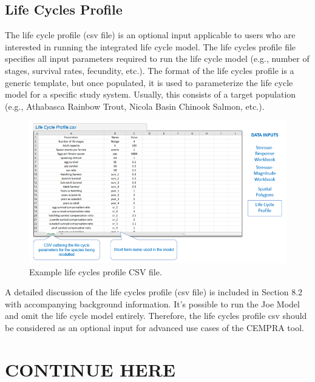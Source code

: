 \documentclass[
  letterpaper,
  DIV=11,
  numbers=noendperiod]{scrreprt}
\begin{document}
\hypertarget{life-cycles-profile}{%
\section{Life Cycles Profile}\label{life-cycles-profile}}

The life cycle profile (csv file) is an optional input applicable to
users who are interested in running the integrated life cycle model. The
life cycles profile file specifies all input parameters required to run
the life cycle model (e.g., number of stages, survival rates, fecundity,
etc.). The format of the life cycles profile is a generic template, but
once populated, it is used to parameterize the life cycle model for a
specific study system. Usually, this consists of a target population
(e.g., Athabasca Rainbow Trout, Nicola Basin Chinook Salmon, etc.).

\begin{figure}

{\centering \includegraphics{images/image024.png}

}

\caption{\label{fig-life-cycles-profile}Example life cycles profile CSV
file.}

\end{figure}

A detailed discussion of the life cycles profile (csv file) is included
in Section 8.2 with accompanying background information. It's possible
to run the Joe Model and omit the life cycle model entirely. Therefore,
the life cycles profile csv should be considered as an optional input
for advanced use cases of the CEMPRA tool.


\hypertarget{continue-here}{%
\chapter{CONTINUE HERE}\label{continue-here}}
\end{document}
